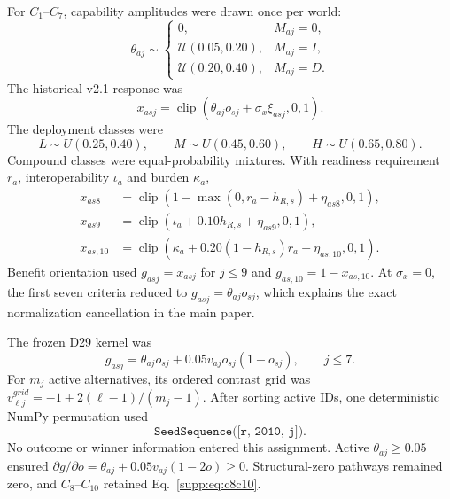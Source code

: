 \documentclass[runningheads,orivec]{llncs}
\newcommand{\clip}{\operatorname{clip}}
\begin{document}
For $C_1$--$C_7$, capability amplitudes were drawn once per world:
\begin{equation}
\theta_{aj}\sim
\begin{cases}
0,&M_{aj}=0,\\
\mathcal U(0.05,0.20),&M_{aj}=I,\\
\mathcal U(0.20,0.40),&M_{aj}=D.
\end{cases}
\label{supp:eq:effectbands}
\end{equation}
The historical v2.1 response was
\begin{equation}
x_{asj}=\clip\!\left(\theta_{aj}o_{sj}+\sigma_x\xi_{asj},0,1\right).
\label{supp:eq:v21}
\end{equation}
The deployment classes were
\begin{equation}
L\sim U(0.25,0.40),\qquad
M\sim U(0.45,0.60),\qquad
H\sim U(0.65,0.80).
\label{supp:eq:deploymentclasses}
\end{equation}
Compound classes were equal-probability mixtures. With readiness
requirement $r_a$, interoperability $\iota_a$ and burden $\kappa_a$,
\begin{align}
x_{as8}&=\clip\!\left(1-\max(0,r_a-h_{R,s})+\eta_{as8},0,1\right),\nonumber\\
x_{as9}&=\clip\!\left(\iota_a+0.10h_{R,s}+\eta_{as9},0,1\right),\nonumber\\
x_{as,10}&=\clip\!\left(\kappa_a+0.20(1-h_{R,s})r_a+\eta_{as,10},0,1\right).
\label{supp:eq:c8c10}
\end{align}
Benefit orientation used $g_{asj}=x_{asj}$ for $j\le9$ and
$g_{as,10}=1-x_{as,10}$. At $\sigma_x=0$, the first seven criteria reduced to
$g_{asj}=\theta_{aj}o_{sj}$, which explains the exact normalization cancellation in the main
paper.

The frozen D29 kernel was
\begin{equation}
g_{asj}=\theta_{aj}o_{sj}+0.05v_{aj}o_{sj}(1-o_{sj}),\qquad j\le7.
\label{supp:eq:d29}
\end{equation}
For $m_j$ active alternatives, its ordered contrast grid was
$v^{grid}_{\ell j}=-1+2(\ell-1)/(m_j-1)$. After sorting active IDs, one deterministic NumPy
permutation used
\begin{equation}
\texttt{SeedSequence([r, 2010, j])}.
\label{supp:eq:d29seedsequence}
\end{equation}
No outcome or
winner information entered this assignment. Active $\theta_{aj}\ge0.05$ ensured
$\partial g/\partial o=\theta_{aj}+0.05v_{aj}(1-2o)\ge0$. Structural-zero pathways remained
zero, and $C_8$--$C_{10}$ retained Eq.~\eqref{supp:eq:c8c10}.
\end{document}
